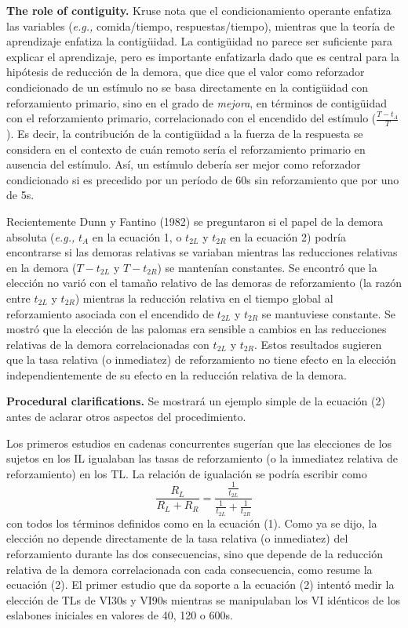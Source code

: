 \documentclass[a4paper,12pt]{article}
\begin{document}
{\bfseries The role of contiguity.} Kruse nota que el condicionamiento operante enfatiza las variables ({\itshape e.g.,} comida/tiempo, respuestas/tiempo), mientras que la teoría de aprendizaje enfatiza la contigüidad. La contigüidad no parece ser suficiente para explicar el aprendizaje, pero es importante enfatizarla dado que es central para la hipótesis de reducción de la demora, que dice que el valor como reforzador condicionado de un estímulo no se basa directamente en la contigüidad con reforzamiento primario, sino en el grado de {\itshape mejora}, en términos de contigüidad con el reforzamiento primario, correlacionado con el encendido del estímulo ($\frac{T-t_{A}}T{}$). Es decir, la contribución de la contigüidad a la fuerza de la respuesta se considera en el contexto de cuán remoto sería el reforzamiento primario en ausencia del estímulo. Así, un estímulo debería ser mejor como reforzador condicionado si es precedido por un período de 60s sin reforzamiento que por uno de 5s. 

Recientemente Dunn y Fantino (1982) se preguntaron si el papel de la demora absoluta ({\itshape e.g.,} $t_{A}$ en la ecuación 1, o $t_{2L}$ y $t_{2R}$ en la ecuación 2) podría encontrarse si las demoras relativas se variaban mientras las reducciones relativas en la demora ($T-t_{2L}$ y $T-t_{2R}$) se mantenían constantes. Se encontró que la elección no varió con el tamaño relativo de las demoras de reforzamiento (la razón entre $t_{2L}$ y $t_{2R}$) mientras la reducción relativa en el tiempo global al reforzamiento asociada con el encendido de $t_{2L}$ y $t_{2R}$ se mantuviese constante. Se mostró que la elección de las palomas era sensible a cambios en las reducciones relativas de la demora correlacionadas con $t_{2L}$ y $t_{2R}$. Estos resultados sugieren que la tasa relativa (o inmediatez) de reforzamiento no tiene efecto en la elección independientemente de su efecto en la reducción relativa de la demora.

{\bfseries Procedural clarifications.} Se mostrará un ejemplo simple de la ecuación (2) antes de aclarar otros aspectos del procedimiento. 

Los primeros estudios en cadenas concurrentes sugerían que las elecciones de los sujetos en los IL igualaban las tasas de reforzamiento (o la inmediatez relativa de reforzamiento) en los TL. La relación de igualación se podría escribir como
\begin{equation}
\frac{
R_{L}
}{
R_{L} + R_{R}
}
=
\frac{
	\frac{1}{t_{2L}}
}{
	\frac{1}{t_{2L}}
	+
	\frac{1}{t_{2R}}
}
\end{equation}
con todos los términos definidos como en la ecuación (1). Como ya se dijo, la elección no depende directamente de la tasa relativa (o inmediatez) del reforzamiento durante las dos consecuencias, sino que depende de la reducción relativa de la demora correlacionada con cada consecuencia, como resume la ecuación (2). El primer estudio que da soporte a la ecuación (2) intentó medir la elección de TLs de VI30s y VI90s mientras se manipulaban los VI idénticos de los eslabones iniciales en valores de 40, 120 o 600s. 
\end{document}
